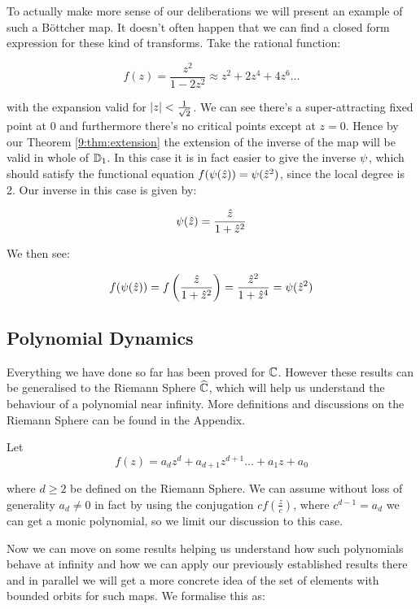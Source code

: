 \documentclass[../main.tex]{subfiles}
\begin{document}
\begin{exl}
To actually make more sense of our deliberations we will present an example of such a B\"ottcher map. It doesn't often happen that we can find a closed form expression for these kind of transforms. Take the rational function:

$$f(z) = \frac{z^2}{1-2z^2} \approx z^2+2z^4+4z^6\dots$$

with the expansion valid for $\left|z\right|<\frac{1}{\sqrt{2}}$. We can see there's a super-attracting fixed point at 0 and furthermore there's no critical points except at $z=0$. Hence by our Theorem \ref{9:thm:extension} the extension of the inverse of the map will be valid in whole of $\mathbb{D}_1$. In this case it is in fact easier to give the inverse $\psi$, which should satisfy the functional equation $f(\psi(\hat{z})) = \psi(\hat{z}^2)$, since the local degree is 2. Our inverse in this case is given by:

$$\psi(\hat{z}) = \frac{\hat{z}}{1+\hat{z}^2}$$

We then see:

$$f(\psi(\hat{z})) = f\left(\frac{\hat{z}}{1+\hat{z}^2}\right) = \frac{\hat{z}^2}{1+\hat{z}^4} = \psi(\hat{z}^2)$$
\end{exl}


\subsection{Polynomial Dynamics}

Everything we have done so far has been proved for $\mathbb{C}$. However these results can be generalised to the Riemann Sphere $\widehat{\mathbb{C}}$, which will help us understand the behaviour of a polynomial near infinity. More definitions and discussions on the Riemann Sphere can be found in the Appendix. 

Let 
\begin{equation}
f(z) = a_dz^d + a_{d+1}z^{d+1}\dots+a_1z + a_0
\end{equation}

where $d\geq 2$ be defined on the Riemann Sphere. We can assume without loss of generality $a_d \neq 0$ in fact by using the conjugation $cf(\frac{z}{c})$, where $c^{d-1} = a_d$ we can get a monic polynomial, so we limit our discussion to this case. 

Now we can move on some results helping us understand how such polynomials behave at infinity and how we can apply our previously established results there and in parallel we will get a more concrete idea of the set of elements with bounded orbits for such maps. We formalise this as:
\end{document}
